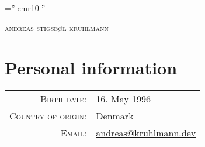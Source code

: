 \documentclass[a4paper,10pt]{article}
\begin{document}
\pagestyle{empty} %

\font\fb=''[cmr10]'' %

\par{\centering
		{\Huge \textsc{andreas stigsb\o l kr\"uhlmann}
	}\bigskip\par}

\section{Personal information}

\begin{tabular}{rl}
    \textsc{Birth date:} & 16. May 1996\\
    \textsc{Country of origin:}     & Denmark\\
    \textsc{Email:}       & \href{mailto:andreas@kruhlmann.dev}{andreas@kruhlmann.dev}
\end{tabular}

\end{document}
